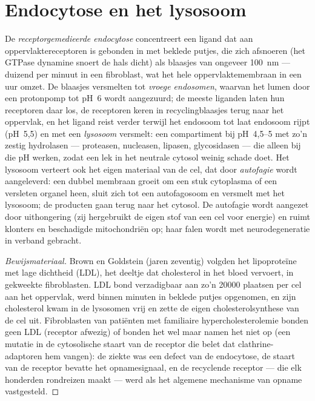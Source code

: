 \section{Endocytose en het lysosoom}

\begin{definition}[Endocytose]\label{def:b3:membrane-traffic:endocytosis}
De \emph{receptorgemedieerde endocytose} concentreert een ligand dat
aan oppervlaktereceptoren is gebonden in met  beklede putjes,
die zich afsnoeren (het GTPase dynamine snoert de hals dicht) als
blaasjes van ongeveer \qty{100}{nm} --- duizend per minuut in een
fibroblast, wat het hele oppervlaktemembraan in een uur omzet. De
blaasjes versmelten tot \emph{vroege endosomen}, waarvan het lumen door
een protonpomp tot pH~6 wordt aangezuurd; de meeste liganden laten hun
receptoren daar los, de receptoren keren in recyclingblaasjes terug
naar het oppervlak, en het ligand reist verder terwijl het endosoom tot
laat endosoom rijpt (pH~5,5) en met een \emph{lysosoom} versmelt: een
compartiment bij pH~4,5--5 met zo'n zestig hydrolasen --- proteasen,
nucleasen, lipasen, glycosidasen --- die alleen bij die pH werken,
zodat een lek in het neutrale cytosol weinig schade doet. Het lysosoom
verteert ook het eigen materiaal van de cel, dat door \emph{autofagie}
wordt aangeleverd: een dubbel membraan groeit om een stuk cytoplasma of
een versleten organel heen, sluit zich tot een autofagosoom en
versmelt met het lysosoom; de producten gaan terug naar het cytosol. De
autofagie wordt aangezet door uithongering (zij hergebruikt de eigen
stof van een cel voor energie) en ruimt klonters en beschadigde
mitochondriën op; haar falen wordt met neurodegeneratie in verband
gebracht.
\end{definition}

\begin{proof}[Bewijsmateriaal]
Brown en Goldstein (jaren zeventig) volgden het lipoproteïne met lage
dichtheid (LDL), het deeltje dat cholesterol in het bloed vervoert, in
gekweekte fibroblasten. LDL bond verzadigbaar aan zo'n \num{20000}
plaatsen per cel aan het oppervlak, werd binnen minuten in beklede
putjes opgenomen, en zijn cholesterol kwam in de lysosomen vrij en zette
de eigen cholesterolsynthese van de cel uit. Fibroblasten van patiënten
met familiaire hypercholesterolemie bonden geen LDL (receptor afwezig)
of bonden het wel maar namen het niet op (een mutatie in de
cytosolische staart van de receptor die belet dat clathrine-adaptoren
hem vangen): de ziekte was een defect van de endocytose, de staart van
de receptor bevatte het opnamesignaal, en de recyclende receptor ---
die elk honderden rondreizen maakt --- werd als het algemene mechanisme
van opname vastgesteld.
\end{proof}

